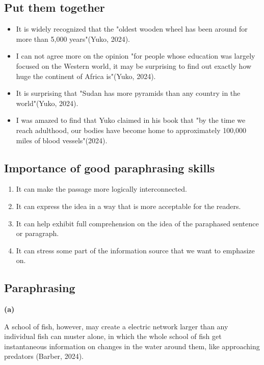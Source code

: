 \documentclass[a4paper]{article}
\begin{document}
\subsection{Put them together}

\begin{itemize}
    \item It is widely recognized that the "oldest wooden wheel has been around for more than 5,000 years"(Yuko, 2024). 
    \item I can not agree more on the opinion "for people whose education was largely focused on the Western world, it may be surprising to find out exactly how huge the continent of Africa is"(Yuko, 2024).
    \item It is surprising that "Sudan has more pyramids than any country in the world"(Yuko, 2024).
    \item I was amazed to find that Yuko claimed in his book that "by the time we reach adulthood, our bodies have become home to approximately 100,000 miles of blood vessels"(2024).
\end{itemize}

\subsection{Importance of good paraphrasing skills}

\begin{enumerate}
    \item It can make the passage more logically interconnected.
    \item It can express the idea in a way that is more acceptable for the readers.
    \item It can help exhibit full comprehension on the idea of the paraphased sentence or paragraph.
    \item It can stress some part of the information source that we want to emphasize on.
\end{enumerate}


\subsection{Paraphrasing}

\textbf{(a)}

A school of fish, however, may create a electric network larger than any individual fish can muster alone, in which the whole school of fish get instantaneous information on changes in the water around them, like approaching predators (Barber, 2024).
\end{document}
